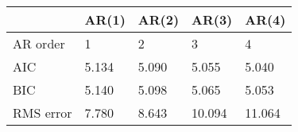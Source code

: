 \begin{tabular}{lllll}
\toprule
{} &  AR(1) &  AR(2) &   AR(3) &   AR(4) \\
\midrule
AR order  &      1 &      2 &       3 &       4 \\
AIC       &  5.134 &  5.090 &   5.055 &   5.040 \\
BIC       &  5.140 &  5.098 &   5.065 &   5.053 \\
RMS error &  7.780 &  8.643 &  10.094 &  11.064 \\
\bottomrule
\end{tabular}
